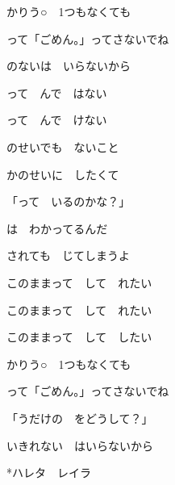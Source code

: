 \documentclass[a4paper,tate,twocolumn,12pt]{ltjtarticle}
\begin{document}
\begin{flushleft}
\begin{minipage}{\linewidth}
かりう○　1つもなくても

って「ごめん。」ってさないでね

のないは　いらないから
\end{minipage}

\vspace{2em}

\noindent\begin{minipage}{\linewidth}
って　んで　はない

って　んで　けない

のせいでも　ないこと

かのせいに　したくて

「って　いるのかな？」

は　わかってるんだ

されても　じてしまうよ
\end{minipage}

\vspace{3em}

\noindent\begin{minipage}{\linewidth}
このままって　して　れたい

このままって　して　れたい
\end{minipage}

\vspace{2em}

\noindent\begin{minipage}{\linewidth}
このままって　して　したい

かりう○　1つもなくても

って「ごめん。」ってさないでね

「うだけの　をどうして？」

いきれない　はいらないから
\end{minipage}

\vspace{2em}

\noindent\begin{minipage}{\linewidth}
*ハレタ　レイラ
\end{minipage}

\end{flushleft}
\end{document}
